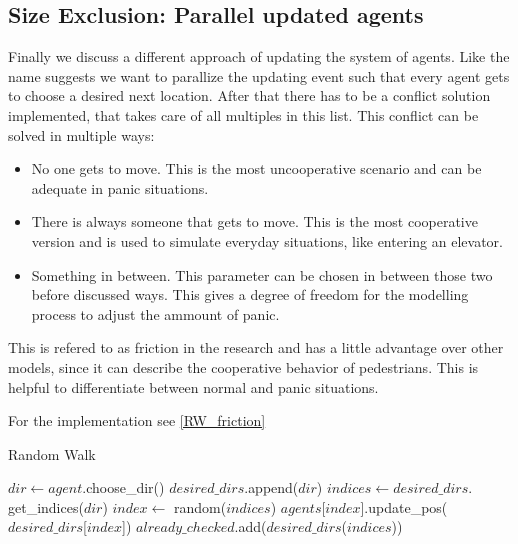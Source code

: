 \subsection{Size Exclusion: Parallel updated agents}
Finally we discuss a different approach of updating the system of agents. Like the name suggests we want to parallize the 
updating event such that every agent gets to choose a desired next location. After that there has to be a conflict solution implemented, 
that takes care of all multiples in this list.
This conflict can be solved in multiple ways: 
\begin{itemize}
   \item No one gets to move. This is the most uncooperative scenario and can be adequate in panic situations.
   \item There is always someone that gets to move. This is the most cooperative version and is used to simulate everyday situations, 
   like entering an elevator.
   \item Something in between. This parameter can be chosen in between those two before discussed ways. 
   This gives a degree of freedom for the modelling process to adjust the ammount of panic. 
\end{itemize} 
This is refered to as friction in the research and has a little advantage over other models, 
since it can describe the cooperative behavior of pedestrians. 
This is helpful to differentiate between normal and panic situations.

For the implementation see \ref{RW_friction}

\begin{algorithm}
   \caption{Random Walk}\label{RW_friction}
   \begin{algorithmic}[1]
         \State $dir \gets agent.$choose\_dir()
         \State $desired\_dirs.$append($dir$)
               \State \Return
            \EndIf
               \State \Return
            \EndIf
               \State $indices \gets $$desired\_dirs.$get\_indices($dir$)
               \State $index \gets$  random($indices$)
               \State $agents$[$index$].update\_pos($desired\_dirs$[$index$])
               \State $already\_checked$.add($desired\_dirs$($indices$))
            \EndIf
         \EndFor
      \EndFor
   \EndFor
   \EndProcedure
   \end{algorithmic}
   \end{algorithm}

